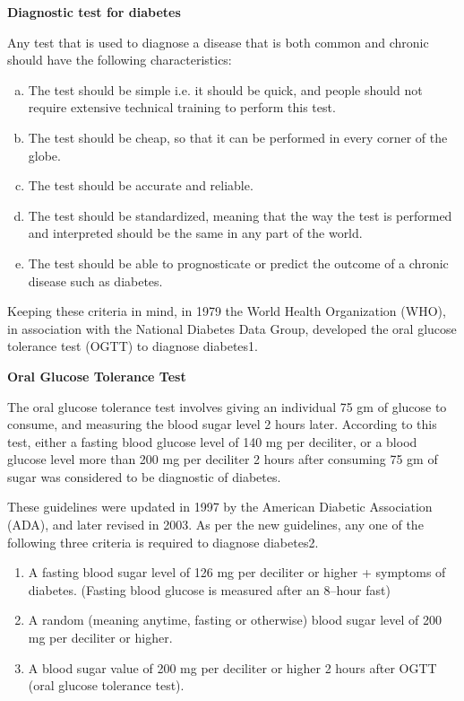 \noindent
\textbf{Diagnostic test for diabetes}

Any test that is used to diagnose a disease that is both common and chronic should have the following characteristics:

\begin{enumerate}[a.]
\itemsep=0pt
\item The test should be simple i.e. it should be quick, and people should not require extensive technical training to perform this test.
 \item The test should be cheap, so that it can be performed in every corner of the globe.
 \item The test should be accurate and reliable.
 \item The test should be standardized, meaning that the way the test is performed and interpreted should be the same in any part of the world.
 \item The test should be able to prognosticate or predict the outcome of a chronic disease such as diabetes.
 \end{enumerate}

Keeping these criteria in mind, in 1979 the World Health Organi\-zation (WHO), in association with the National Diabetes Data Group, developed the oral glucose tolerance test (OGTT) to diagnose diabetes1.

\noindent
\textbf{Oral Glucose Tolerance Test}

The oral glucose tolerance test involves giving an individual 75 gm of glucose to consume, and measuring the blood sugar level 2 hours later. According to this test, either a fasting blood glucose level of 140 mg per deciliter, or a blood glucose level more than 200 mg per deciliter 2 hours after consuming 75 gm of sugar was considered to be diagnostic of diabetes.

These guidelines were updated in 1997 by the American Diabetic Association (ADA), and later revised in 2003. As per the new guidelines, any one of the following three criteria is required to diagnose diabetes2.

\begin{enumerate}
\itemsep=0pt
\item A fasting blood sugar level of 126 mg per deciliter or higher + symptoms of diabetes. (Fasting blood glucose is measured after an 8–hour fast)
\item A random (meaning anytime, fasting or otherwise) blood sugar level of 200 mg per deciliter or higher.
\item A blood sugar value of 200 mg per deciliter or higher 2 hours after OGTT (oral glucose tolerance test).
 \end{enumerate}

